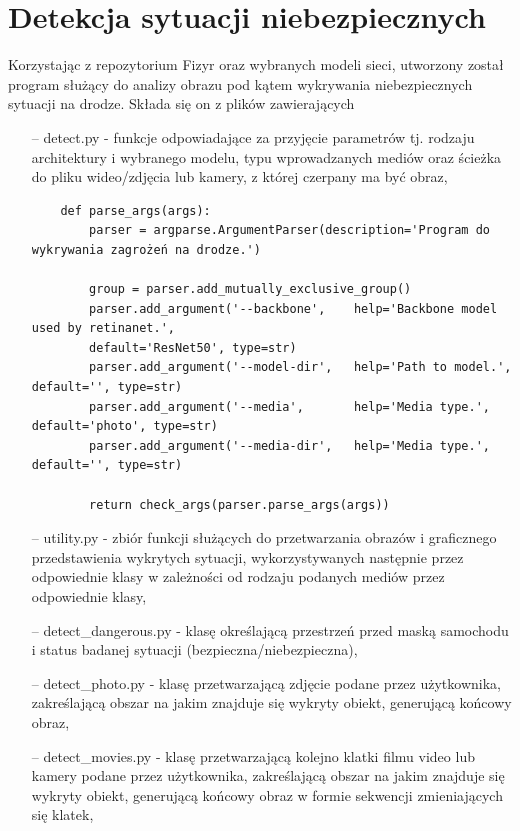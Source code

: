 \section{Detekcja sytuacji niebezpiecznych}
\hspace{0.5cm}
Korzystając z repozytorium Fizyr oraz wybranych modeli sieci, utworzony został program służący do analizy obrazu pod kątem wykrywania niebezpiecznych sytuacji na drodze. Składa się on z plików zawierających

\begin{itemize}
    \item[--] detect.py - funkcje odpowiadające za przyjęcie parametrów tj. rodzaju architektury i wybranego modelu, typu wprowadzanych mediów oraz ścieżka do pliku wideo/zdjęcia lub kamery, z której czerpany ma być obraz,

    \begin{code}
    \label{code:c-code}
    \begin{verbatim}
    def parse_args(args):
        parser = argparse.ArgumentParser(description='Program do wykrywania zagrożeń na drodze.')
        
        group = parser.add_mutually_exclusive_group()
        parser.add_argument('--backbone',    help='Backbone model used by retinanet.',       
        default='ResNet50', type=str)
        parser.add_argument('--model-dir',   help='Path to model.', default='', type=str) 
        parser.add_argument('--media',       help='Media type.', default='photo', type=str) 
        parser.add_argument('--media-dir',   help='Media type.', default='', type=str) 
        
        return check_args(parser.parse_args(args))
    \end{verbatim}
    \end{code}

    \item[--] utility.py - zbiór funkcji służących do przetwarzania obrazów i graficznego przedstawienia wykrytych sytuacji, wykorzystywanych następnie przez odpowiednie klasy w zależności od rodzaju podanych mediów przez odpowiednie klasy,
    \item[--] detect\_dangerous.py - klasę określającą przestrzeń przed maską samochodu i status badanej sytuacji (bezpieczna/niebezpieczna),
    \item[--] detect\_photo.py - klasę przetwarzającą zdjęcie podane przez użytkownika, zakreślającą obszar na jakim znajduje się wykryty obiekt, generującą końcowy obraz,
    \item[--] detect\_movies.py - klasę przetwarzającą kolejno klatki filmu video lub kamery podane przez użytkownika, zakreślającą obszar na jakim znajduje się wykryty obiekt, generującą końcowy obraz w formie sekwencji zmieniających się klatek,
    
\end{itemize}

